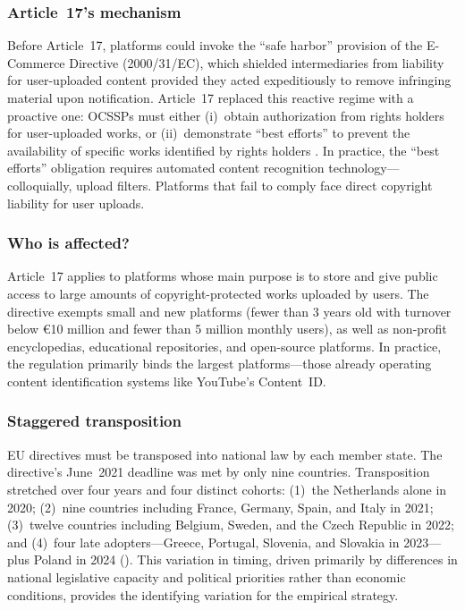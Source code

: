 \documentclass[12pt]{article}
\begin{document}
\subsubsection*{Article~17's mechanism} Before Article~17, platforms could invoke the ``safe harbor'' provision of the E-Commerce Directive (2000/31/EC), which shielded intermediaries from liability for user-uploaded content provided they acted expeditiously to remove infringing material upon notification. Article~17 replaced this reactive regime with a proactive one: OCSSPs must either (i)~obtain authorization from rights holders for user-uploaded works, or (ii)~demonstrate ``best efforts'' to prevent the availability of specific works identified by rights holders \citep{quintais2020untangling}. In practice, the ``best efforts'' obligation requires automated content recognition technology---colloquially, upload filters. Platforms that fail to comply face direct copyright liability for user uploads.

\subsubsection*{Who is affected?} Article~17 applies to platforms whose main purpose is to store and give public access to large amounts of copyright-protected works uploaded by users. The directive exempts small and new platforms (fewer than 3 years old with turnover below \euro10 million and fewer than 5 million monthly users), as well as non-profit encyclopedias, educational repositories, and open-source platforms. In practice, the regulation primarily binds the largest platforms---those already operating content identification systems like YouTube's Content~ID.

\subsubsection*{Staggered transposition} EU directives must be transposed into national law by each member state. The directive's June~2021 deadline was met by only nine countries. Transposition stretched over four years and four distinct cohorts: (1)~the Netherlands alone in 2020; (2)~nine countries including France, Germany, Spain, and Italy in 2021; (3)~twelve countries including Belgium, Sweden, and the Czech Republic in 2022; and (4)~four late adopters---Greece, Portugal, Slovenia, and Slovakia in 2023---plus Poland in 2024 (). This variation in timing, driven primarily by differences in national legislative capacity and political priorities rather than economic conditions, provides the identifying variation for the empirical strategy.
\end{document}
